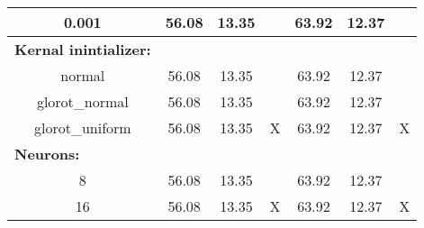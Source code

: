 \documentclass[12pt,a4paper]{article}
\begin{document}
\begin{table}[]
\begin{tabular}{ccccccc}
0.001                                             & 56.08                                                    & 13.35    &                                                             & 63.92                                                   & 12.37    &                                                             \\ \hline
\multicolumn{1}{l}{\textbf{Kernal inintializer:}} &                                                          &          &                                                             &                                                         &          &                                                             \\
normal                                            & 56.08                                                    & 13.35    &                                                             & 63.92                                                   & 12.37    &                                                             \\
glorot\_normal                                    & 56.08                                                    & 13.35    &                                                             & 63.92                                                   & 12.37    &                                                             \\
glorot\_uniform                                   & 56.08                                                    & 13.35    & X                                                           & 63.92                                                   & 12.37    & X                                                           \\ \hline
\multicolumn{1}{l}{\textbf{Neurons:}}             &                                                          &          &                                                             &                                                         &          &                                                             \\
8                                                 & 56.08                                                    & 13.35    &                                                             & 63.92                                                   & 12.37    &                                                             \\
16                                                & 56.08                                                    & 13.35    & X                                                           & 63.92                                                   & 12.37    & X                                                           \\

\end{tabular}
\end{table}
\end{document}
